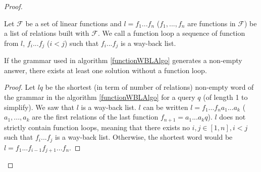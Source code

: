 \documentclass[10pt,a4paper,draft]{article}
\begin{document}
\begin{proof}

\begin{Definition}
Let $\mathcal{F}$ be a set of linear functions and $l = f_1 ... f_n$ ($f_1,...,f_n$ are functions in $\mathcal{F}$) be a list of relations built with $\mathcal{F}$. We call a function loop a sequence of function from $l$, $f_i ... f_j$ ($i < j$) such that $f_i ... f_j$ is a way-back list.
\end{Definition}

\begin{Lemma}
If the grammar used in algorithm \ref{functionWBLAlgo} generates a non-empty answer, there exists at least one solution without a function loop.
\end{Lemma}

\begin{proof}

Let $lq$ be the shortest (in term of number of relations) non-empty word of the grammar in the algorithm \ref{functionWBLAlgo} for a query $q$ (of length 1 to simplify). We saw that $l$ is a way-back list. $l$ can be written $l = f_1 ... f_n a_1 ... a_k$ ($a_1,...,a_k$ are the first relations of the last function $f_{n+1} = a_1 ... a_k q$). $l$ does not strictly contain function loops, meaning that there exists no $i,j \in [1, n], i<j$ such that $f_i ... f_j$ is a way-back list. Otherwise, the shortest word would be $l = f_1 ... f_{i-1} f_{j+1} ... f_n$.

\end{proof}






\end{proof}
\end{document}
